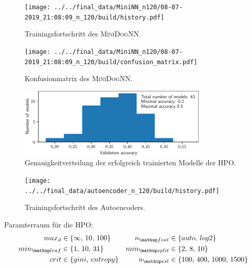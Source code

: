 \begin{figure}
\centering
\centering
\texttt{[image: ../../final\_data/MiniNN\_n120/08-07-2019\_21:08:09\_n\_120/build/history.pdf]}
\caption{Trainingsfortschritt des \textsc{MiniDogNN}.}
\label{fig:MiniDogNN_120_Loss_Acc}
\end{figure}
\begin{figure}
\centering
\texttt{[image: ../../final\_data/MiniNN\_n120/08-07-2019\_21:08:09\_n\_120/build/confusion\_matrix.pdf]}
\caption{Konfusionmatrix des \textsc{MiniDogNN}.}
\label{fig:MiniDogNN_120_Konfusionmatrix}
\end{figure}

\begin{figure}
\centering
\includegraphics[width=0.8\textwidth]{../../final_data/MiniNN_n5/acc_hist.pdf}
\caption{Genauigkeitverteilung der erfolgreich trainierten Modelle der HPO.}
\label{fig:Genauigkeitverteilung_MiniDogNN}
\end{figure}

\begin{figure}
\centering
\centering
\texttt{[image: ../../final\_data/autoencoder\_n\_120/build/history.pdf]}
\caption{Trainingsfortschritt des Autoencoders.}
\label{fig:Autoencoder_loss}
\end{figure}

Paramterraum für die HPO:
\begin{align}
  \begin{aligned}
    \label{eq: rf_parameter_raum}
    max_d &\in \left\{\infty,\, 10,\, 100\right\} & n\ua{feat}&\in\left\{auto, \,log2\right\}\\
    min\ua{leaf} &\in \left\{1,\, 10,\, 31\right\} & min\ua{split}&\in\left\{2,\, 8,\, 10\right\}\\
    crit &\in \left\{gini,\, entropy\right\} & n\ua{est}&\in\left\{100,\, 400,\, 1000,\, 1500 \right\}
  \end{aligned}
\end{align}


